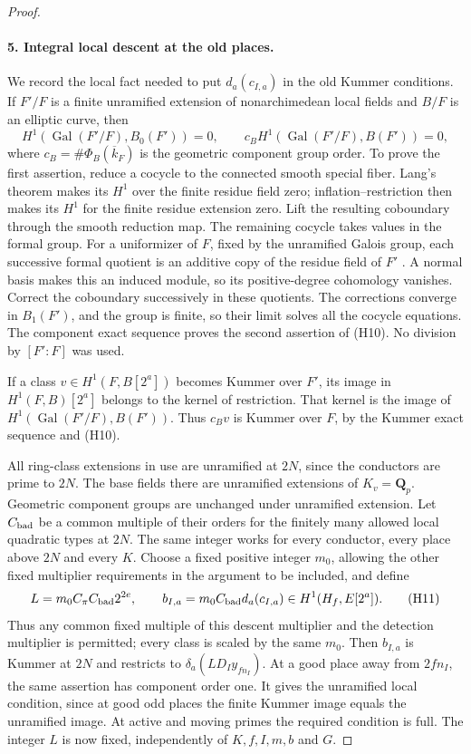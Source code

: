 \documentclass[11pt]{article}
\theoremstyle{definition}
\theoremstyle{remark}
\begin{document}
\begin{proof}
\paragraph{5. Integral local descent at the old places.}
We record the local fact needed to put $d_a(c_{I,a})$ in the old
Kummer conditions. If $F'/F$ is a finite unramified extension of
nonarchimedean local fields and $B/F$ is an elliptic curve, then
\[
 H^1(\operatorname{Gal}(F'/F),B_0(F'))=0,\qquad
 c_B H^1(\operatorname{Gal}(F'/F),B(F'))=0,             \tag{H10}
\]
where $c_B=\#\Phi_B(\overline{k}_F)$ is the geometric component
group order. To prove the first assertion, reduce a cocycle to
the connected smooth special fiber. Lang's theorem \cite[Theorem~1 and its corollary]{lang1956} makes its
$H^1$ over the finite residue field zero; inflation--restriction
then makes its $H^1$ for the finite residue extension zero.
Lift the resulting coboundary through the smooth reduction map.
The remaining cocycle takes values in the formal group. For a
uniformizer of $F$, fixed by the unramified Galois group, each
successive formal quotient is an additive copy of the residue
field of $F'$ \cite[IV.3.2(a), p.~124]{silverman}. A normal basis makes this an induced module, so
its positive-degree cohomology vanishes. Correct the coboundary
successively in these quotients. The corrections converge in
$B_1(F')$, and the group is finite, so their limit solves all
the cocycle equations. The component exact sequence proves the
second assertion of (H10). No division by $[F':F]$ was used.

If a class $v\in H^1(F,B[2^a])$ becomes Kummer over $F'$, its
image in $H^1(F,B)[2^a]$ belongs to the kernel of restriction.
That kernel is the image of
$H^1(\operatorname{Gal}(F'/F),B(F'))$. Thus $c_Bv$ is Kummer
over $F$, by the Kummer exact sequence and (H10).

All ring-class extensions in use are unramified at $2N$, since
the conductors are prime to $2N$. The base fields there are
unramified extensions of $K_v=\mathbf Q_p$. Geometric component
groups are unchanged under unramified extension. Let $C_{\rm bad}$
be a common multiple of their orders for the finitely many
allowed local quadratic types at $2N$. The same integer works
for every conductor, every place above $2N$ and every $K$.
Choose a fixed positive integer $m_0$, allowing the other fixed
multiplier requirements in the argument to be included, and define
\[
 L=m_0C_\pi C_{\rm bad}2^{2e},\qquad
 b_{I,a}=m_0C_{\rm bad}d_a(c_{I,a})\in H^1(H_f,E[2^a]). \tag{H11}
\]
Thus any common fixed multiple of this descent multiplier and
the detection multiplier is permitted; every class is scaled by
the same $m_0$.
Then $b_{I,a}$ is Kummer at $2N$ and restricts to
$\delta_a(LD_Iy_{fn_I})$. At a good place away from $2fn_I$,
the same assertion has component order one. It gives the
unramified local condition, since at good odd places the finite
Kummer image equals the unramified image. At active and moving
primes the required condition is full. The integer $L$ is now
fixed, independently of $K,f,I,m,b$ and $G$.


\end{proof}
\end{document}
